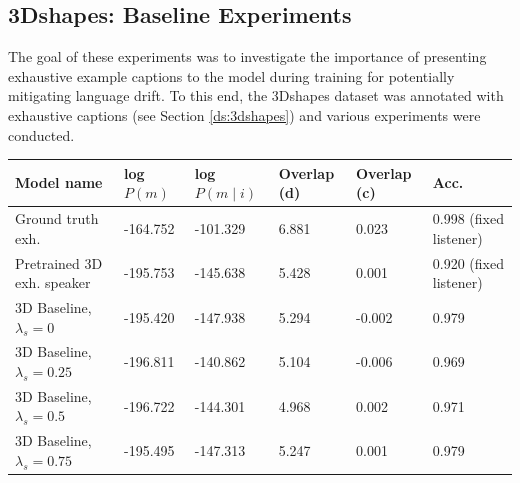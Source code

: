 \subsection{3Dshapes: Baseline Experiments}
\label{expt:3dshapes_baseline}

The goal of these experiments was to investigate the importance of presenting exhaustive example captions to the model during training for potentially mitigating language drift. To this end, the 3Dshapes dataset was annotated with exhaustive captions (see Section \ref{ds:3dshapes}) and various experiments were conducted. %

\begin{table}[] 
	\begin{tabularx}{\textwidth}{|X|l|l|X|X|X|}
		\hline
		\textbf{Model name}                                    & \textbf{log $P(m)$} & \textbf{log $P(m \mid i)$} & \textbf{Overlap (d)} & \textbf{Overlap (c)} & \textbf{Acc.}  \\ \hline
		Ground truth exh.       &      -164.752            &         -101.329               &       6.881             &      0.023               &       0.998 (fixed listener)         \\ \hline
		Pretrained 3D exh. speaker                            &       -195.753            &         -145.638               &        5.428              &      0.001                & 0.920 (fixed listener)            \\ \hline
		3D Baseline, $\lambda_s = 0$ &       -195.420            &    -147.938                    &           5.294            &      -0.002                &                 0.979                 \\ \hline
		3D Baseline, $\lambda_s = 0.25$     &     -196.811              &       -140.862                 &          5.104            &       -0.006               &          0.969                      \\ \hline
		3D Baseline, $\lambda_s = 0.5$   &         -196.722          &        -144.301                &        4.968              &          0.002            &                  0.971            \\ \hline
		3D Baseline, $\lambda_s = 0.75$  &       -195.495        &           -147.313           &          5.247            &         0.001             & 0.979               \\ \hline

\end{tabularx}
\end{table}

